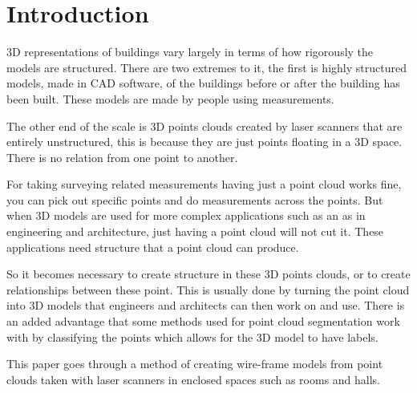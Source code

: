 

\section{Introduction}



3D representations of buildings vary largely in terms of how rigorously the models are structured. There are two extremes to it, the first is highly structured models, made in CAD software, of the buildings before or after the building has been built. These models are made by people using measurements.

The other end of the scale is 3D points clouds created by laser scanners that are entirely unstructured, this is because they are just points floating in a 3D space. There is no relation from one point to another.

For taking surveying related measurements having just a point cloud works fine, you can pick out specific points and do measurements across the points. But when 3D models are used for more complex applications such as an as in engineering and architecture, just having a point cloud will not cut it. These applications need structure that a point cloud can produce.

So it becomes necessary to create structure in these 3D points clouds, or to create relationships between these point. This is usually done by turning the point cloud into 3D models that engineers and architects can then work on and use. There is an added advantage that some methods used for point cloud segmentation work with by classifying the points which allows for the 3D model to have labels.



This paper goes through a method of creating wire-frame models from point clouds taken with laser scanners in enclosed spaces such as rooms and halls. 








